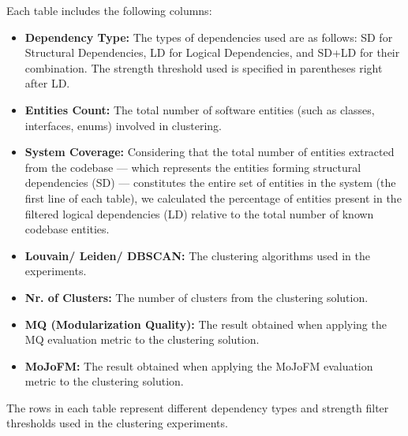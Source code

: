 \documentclass{ieeeaccess}
\begin{document}
Each table includes the following columns:
\begin{itemize}
\item \textbf{Dependency Type:} The types of dependencies used are as follows: SD for Structural Dependencies, LD for Logical Dependencies, and SD+LD for their combination. The strength threshold used is specified in parentheses right after LD.
\item \textbf{Entities Count:} The total number of software entities (such as classes, interfaces, enums) involved in clustering.
\item \textbf{System Coverage:} Considering that the total number of entities extracted from the codebase — which represents the entities forming structural dependencies (SD) — constitutes the entire set of entities in the system (the first line of each table), we calculated the percentage of entities present in the filtered logical dependencies (LD) relative to the total number of known codebase entities.
\item \textbf{Louvain/ Leiden/ DBSCAN:} The clustering algorithms used in the experiments.
\item \textbf{Nr. of Clusters:} The number of clusters from the clustering solution.
\item \textbf{MQ (Modularization Quality):} The result obtained when applying the MQ evaluation metric to the clustering solution.
\item \textbf{MoJoFM:} The result obtained when applying the MoJoFM evaluation metric to the clustering solution.
\end{itemize}

The rows in each table represent different dependency types and strength filter thresholds used in the clustering experiments.
\end{document}
